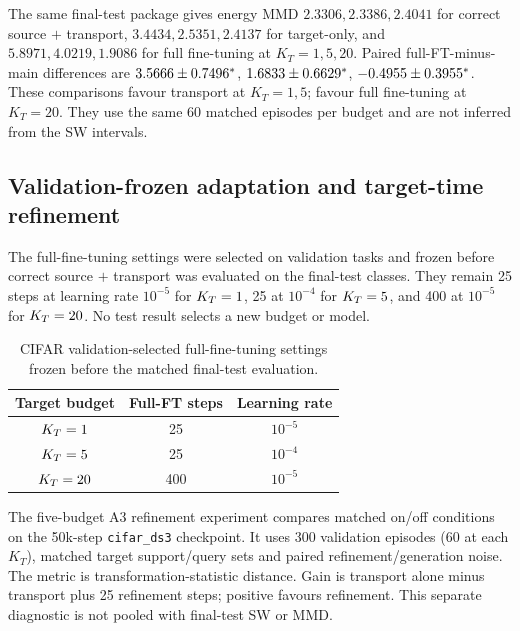The same final-test package gives energy MMD $2.3306, 2.3386, 2.4041$ for correct source $+$ transport, $3.4434, 2.5351, 2.4137$ for target-only, and $5.8971, 4.0219, 1.9086$ for full fine-tuning at $K_T=1,5,20$. Paired full-FT-minus-main differences are $3.5666\pm0.7496^{\ast}$, $1.6833\pm0.6629^{\ast}$, $-0.4955\pm0.3955^{\ast}$. These comparisons favour transport at $K_T=1,5$; favour full fine-tuning at $K_T=20$. They use the same 60 matched episodes per budget and are not inferred from the SW intervals.


\subsection{Validation-frozen adaptation and target-time refinement}
\label{app:cifar-selection}

The full-fine-tuning settings were selected on validation tasks and frozen before correct source $+$ transport was evaluated on the final-test classes. They remain 25 steps at learning rate $10^{-5}$ for $K_T=1$, 25 at $10^{-4}$ for $K_T=5$, and 400 at $10^{-5}$ for $K_T=20$. No test result selects a new budget or model.

\begin{table}[h]
\centering\small
\caption{CIFAR validation-selected full-fine-tuning settings frozen before the matched final-test evaluation.}
\label{tab:cifar-ft-selection}
\begin{tabular}{ccc}
\toprule
Target budget & Full-FT steps & Learning rate\\
\midrule
$K_T=1$ & 25 & $10^{-5}$\\
$K_T=5$ & 25 & $10^{-4}$\\
$K_T=20$ & 400 & $10^{-5}$\\
\bottomrule
\end{tabular}
\end{table}

The five-budget A3 refinement experiment compares matched on/off conditions on the 50k-step \texttt{cifar\_ds3} checkpoint. It uses 300 validation episodes (60 at each $K_T$), matched target support/query sets and paired refinement/generation noise. The metric is transformation-statistic distance. Gain is transport alone minus transport plus 25 refinement steps; positive favours refinement. This separate diagnostic is not pooled with final-test SW or MMD.

